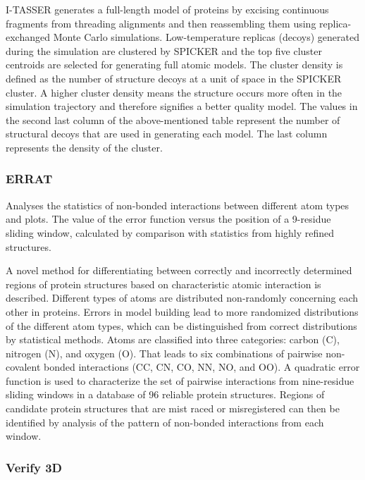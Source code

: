 \documentclass[11pt, letterpaper, portuguese]{article}
\begin{document}
    \par{I-TASSER generates a full-length model of proteins by excising continuous fragments from threading alignments and then reassembling them using replica-exchanged Monte Carlo simulations. Low-temperature replicas (decoys) generated during the simulation are clustered by SPICKER and the top five cluster centroids are selected for generating full atomic models. The cluster density is defined as the number of structure decoys at a unit of space in the SPICKER cluster. A higher cluster density means the structure occurs more often in the simulation trajectory and therefore signifies a better quality model. The values in the second last column of the above-mentioned table represent the number of structural decoys that are used in generating each model. The last column represents the density of the cluster.}

\subsubsection{ERRAT}

    \par{Analyses the statistics of non-bonded interactions between different atom types and plots. The value of the error function versus the position of a 9-residue sliding window, calculated by comparison with statistics from highly refined structures.}

    \par{A novel method for differentiating between correctly and incorrectly determined regions of protein structures based on characteristic atomic interaction is described. Different types of atoms are distributed non-randomly concerning each other in proteins. Errors in model building lead to more randomized distributions of the different atom types, which can be distinguished from correct distributions by statistical methods. Atoms are classified into three categories: carbon (C), nitrogen (N), and oxygen (O). That leads to six combinations of pairwise non-covalent bonded interactions (CC, CN, CO, NN, NO, and OO). A quadratic error function is used to characterize the set of pairwise interactions from nine-residue sliding windows in a database of 96 reliable protein structures. Regions of candidate protein structures that are mist raced or misregistered can then be identified by analysis of the pattern of non-bonded interactions from each window.}

\subsubsection{Verify 3D}
\end{document}
